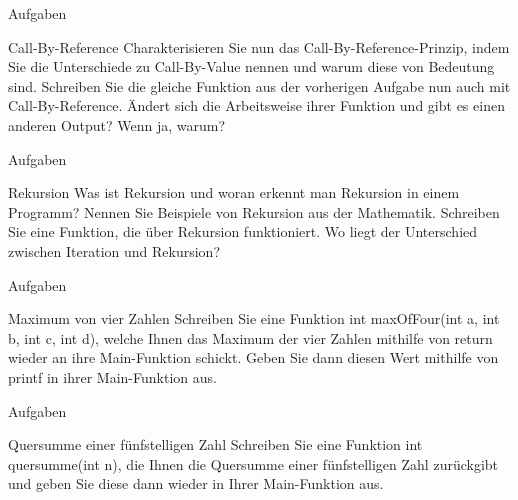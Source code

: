 \documentclass[usenames,dvipsnames,10pt]{beamer}
\begin{document}
    \begin{frame}{Aufgaben}
        \begin{block}{Call-By-Reference}
            Charakterisieren Sie nun das Call-By-Reference-Prinzip, indem Sie die Unterschiede zu Call-By-Value nennen und warum diese von Bedeutung sind.
            Schreiben Sie die gleiche Funktion aus der vorherigen Aufgabe nun auch mit Call-By-Reference. Ändert sich die Arbeitsweise ihrer Funktion und gibt es einen anderen Output? Wenn ja, warum?
        \end{block}
    \end{frame}
    \begin{frame}{Aufgaben}
        \begin{block}{Rekursion}
            Was ist Rekursion und woran erkennt man Rekursion in einem Programm? Nennen Sie Beispiele von Rekursion aus der Mathematik.
            Schreiben Sie eine Funktion, die über Rekursion funktioniert. Wo liegt der Unterschied zwischen Iteration und Rekursion?
        \end{block}
    \end{frame}
    \begin{frame}{Aufgaben}
        \begin{block}{Maximum von vier Zahlen}
            Schreiben Sie eine Funktion int maxOfFour(int a, int b, int c, int d), welche Ihnen das Maximum der vier Zahlen
            mithilfe von return wieder an ihre Main-Funktion schickt. Geben Sie dann diesen Wert mithilfe von printf in ihrer Main-Funktion aus.
        \end{block}
    \end{frame}
    \begin{frame}{Aufgaben}
        \begin{block}{Quersumme einer fünfstelligen Zahl}
            Schreiben Sie eine Funktion int quersumme(int n), die Ihnen die Quersumme einer fünfstelligen Zahl zurückgibt und geben Sie diese
            dann wieder in Ihrer Main-Funktion aus.
        \end{block}
    \end{frame}
\end{document}
